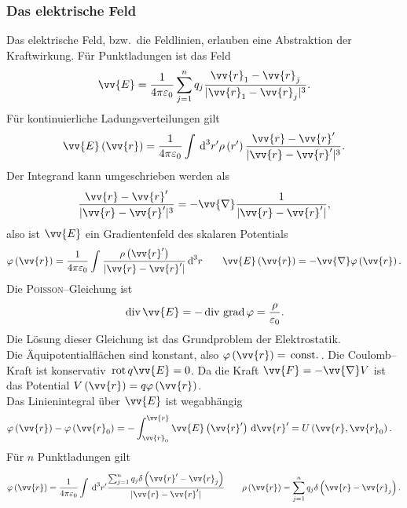 \documentclass[a4paper,12pt]{article}
\newcommand{\td}{\,\text{d}}
\numberwithin{equation}{section}
\begin{document}
\subsubsection{Das elektrische Feld}
Das elektrische Feld, bzw.\ die Feldlinien, erlauben eine Abstraktion der Kraftwirkung. Für Punktladungen ist das Feld
\begin{align} 
        \vv{E}=\dfrac{1}{4\pi \varepsilon _0}\sum_{j=1}^{n}q_j\dfrac{\vv{r}_1-\vv{r}_j}{|\vv{r}_1-\vv{r}_j|^3}
.\end{align} 
Für kontinuierliche Ladungsverteilungen gilt
\begin{align} 
        \vv{E}\left(\vv{r}\right)=\dfrac{1}{4\pi \varepsilon _0}\int_{}^{}\td ^3r'\rho \left(r'\right)\dfrac{\vv{r}-\vv{r}'}{|\vv{r}-\vv{r}'|^3}
.\end{align} 
Der Integrand kann umgeschrieben werden als 
\begin{align} 
        \dfrac{\vv{r}-\vv{r}'}{|\vv{r}-\vv{r}'|^3}=-\vv{\nabla }\dfrac{1}{|\vv{r}-\vv{r}'|}
,\end{align} 
also ist $\vv{E}$ ein Gradientenfeld des skalaren Potentials
\begin{align} 
        \varphi \left(\vv{r}\right)=\dfrac{1}{4\pi \varepsilon _0}\int_{}^{}\dfrac{\rho \left(\vv{r}'\right)}{|\vv{r}-\vv{r}'|}\td ^3r\qquad \vv{E}\left(\vv{r}\right)=-\vv{\nabla }\varphi \left(\vv{r}\right)
.\end{align} 
Die \textsc{Poisson}--Gleichung ist
\begin{align} 
        \,\text{div}\,\vv{E}=-\,\text{div}\,\,\text{grad}\,\varphi =\dfrac{\rho }{\varepsilon _0}
.\end{align} 
Die Lösung dieser Gleichung ist das Grundproblem der Elektrostatik.\\\indent
Die Äquipotentialflächen sind konstant, also $\varphi \left(\vv{r}\right)=\,\text{const.}\,$. Die Coulomb--Kraft ist konservativ $\,\text{rot}\,q\vv{E}=0$. Da die Kraft $\vv{F}=-\vv{\nabla }V$ ist das Potential $V\left(\vv{r}\right)=q\varphi \left(\vv{r}\right)$.\\\indent
Das Linienintegral über $\vv{E}$ ist wegabhängig
\begin{align} 
        \varphi \left(\vv{r}\right)-\varphi \left(\vv{r}_0\right)&=-\int_{\vv{r}_0}^{\vv{r}}\vv{E}\left(\vv{r}'\right)\td \vv{r}'=U\left(\vv{r},\vv{r}_0\right)
.\end{align} 
Für $n$ Punktladungen gilt 
\begin{align} 
        \varphi \left(\vv{r}\right)=\dfrac{1}{4\pi \varepsilon _0}\int_{}^{}\td ^3r'\dfrac{\sum_{j=1}^{n}q_j\delta \left(\vv{r}'-\vv{r}_j\right)}{|\vv{r}-\vv{r}'|}\qquad \rho \left(\vv{r}\right)=\sum_{j=1}^{n}q_j\delta \left(\vv{r}-\vv{r}_j\right)
.\end{align} 
\end{document}
